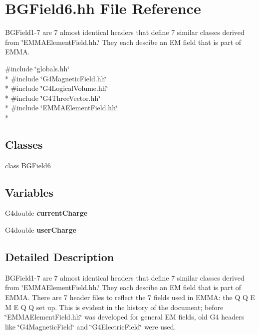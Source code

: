 \hypertarget{BGField6_8hh}{\section{B\-G\-Field6.\-hh File Reference}
\label{BGField6_8hh}
}


B\-G\-Field1-\/7 are 7 almost identical headers that define 7 similar classes derived from \char`\"{}\-E\-M\-M\-A\-Element\-Field.\-hh.\char`\"{} They each descibe an E\-M field that is part of E\-M\-M\-A.  


{\ttfamily \#include \char`\"{}globals.\-hh\char`\"{}}\\*
{\ttfamily \#include \char`\"{}G4\-Magnetic\-Field.\-hh\char`\"{}}\\*
{\ttfamily \#include \char`\"{}G4\-Logical\-Volume.\-hh\char`\"{}}\\*
{\ttfamily \#include \char`\"{}G4\-Three\-Vector.\-hh\char`\"{}}\\*
{\ttfamily \#include \char`\"{}E\-M\-M\-A\-Element\-Field.\-hh\char`\"{}}\\*
\subsection*{Classes}
\begin{DoxyCompactItemize}
\item 
class \hyperlink{classBGField6}{B\-G\-Field6}
\end{DoxyCompactItemize}
\subsection*{Variables}
\begin{DoxyCompactItemize}
\item 
\hypertarget{BGField6_8hh_acb265d8eecfa1acd31056f0c7915362e}{G4double {\bfseries current\-Charge}}\label{BGField6_8hh_acb265d8eecfa1acd31056f0c7915362e}

\item 
\hypertarget{BGField6_8hh_a2d61cdd1b1b5ed409f7c91b54737c1b9}{G4double {\bfseries user\-Charge}}\label{BGField6_8hh_a2d61cdd1b1b5ed409f7c91b54737c1b9}

\end{DoxyCompactItemize}


\subsection{Detailed Description}
B\-G\-Field1-\/7 are 7 almost identical headers that define 7 similar classes derived from \char`\"{}\-E\-M\-M\-A\-Element\-Field.\-hh.\char`\"{} They each descibe an E\-M field that is part of E\-M\-M\-A. There are 7 header files to reflect the 7 fields used in E\-M\-M\-A\-: the Q Q E M E Q Q set up. This is evident in the history of the document; before \char`\"{}\-E\-M\-M\-A\-Element\-Field.\-hh\char`\"{} was developed for general E\-M fields, old G4 headers like \char`\"{}\-G4\-Magnetic\-Field\char`\"{} and \char`\"{}\-G4\-Electric\-Field\char`\"{} were used. 